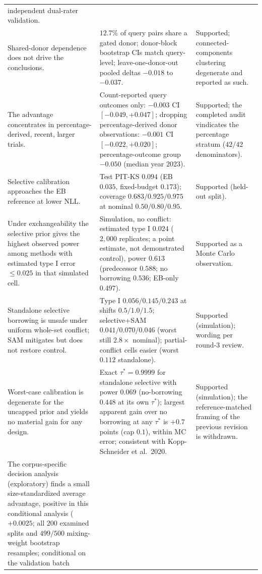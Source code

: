 \documentclass[11pt]{article}
\begin{document}
\begin{longtable}{p{} p{} p{}}
independent dual-rater validation. \\
Shared-donor dependence does not drive the conclusions. & $12.7\%$ of query
pairs share a gated donor; donor-block bootstrap CIs match query-level;
leave-one-donor-out pooled deltas $-0.018$ to $-0.037$. & Supported;
connected-components clustering degenerate and reported as such. \\
The advantage concentrates in percentage-derived, recent, larger trials. &
Count-reported query outcomes only: $-0.003$ CI $[-0.049,+0.047]$; dropping
percentage-derived donor observations: $-0.001$ CI $[-0.022,+0.020]$;
percentage-outcome group $-0.050$ (median year 2023). & Supported; the
completed audit vindicates the percentage stratum ($42/42$ denominators). \\
Selective calibration approaches the EB reference at lower NLL. & Test PIT-KS
$0.094$ (EB $0.035$, fixed-budget $0.173$); coverage $0.683/0.925/0.975$ at
nominal $0.50/0.80/0.95$. & Supported (held-out split). \\
Under exchangeability the selective prior gives the highest observed power
among methods with estimated type I error $\le 0.025$ in that simulated
cell. & Simulation, no conflict: estimated type I $0.024$ ($2{,}000$
replicates; a point estimate, not demonstrated control), power
$0.613$ (predecessor $0.588$; no borrowing $0.536$; EB-only $0.497$). &
Supported as a Monte Carlo observation. \\
Standalone selective borrowing is unsafe under uniform whole-set conflict;
SAM mitigates but does not restore control. & Type I $0.056/0.145/0.243$ at
shifts $0.5/1.0/1.5$; selective+SAM $0.041/0.070/0.046$ (worst still
$2.8\times$ nominal); partial-conflict cells easier (worst $0.112$
standalone). & Supported (simulation); wording per round-3 review. \\
Worst-case calibration is degenerate for the uncapped prior and yields no
material gain for any design. & Exact $\tau^{*}=0.9999$ for standalone
selective with power $0.069$ (no-borrowing $0.448$ at its own $\tau^{*}$);
largest apparent gain over no borrowing at any $\tau^{*}$ is $+0.7$ points
(cap $0.1$), within MC error; consistent with Kopp-Schneider et al.\ 2020.
& Supported (simulation); the reference-matched framing of the previous
revision is withdrawn. \\
The corpus-specific decision analysis (exploratory) finds a small
size-standardized average advantage, positive in this conditional
analysis ($+0.0025$; all $200$ examined splits and $499/500$
mixing-weight bootstrap resamples; conditional on the validation batch

\end{longtable}
\end{document}
